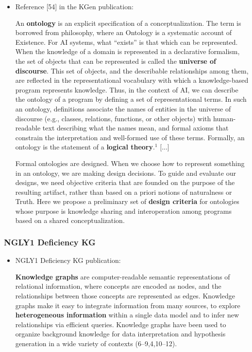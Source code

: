 \documentclass{article}
\begin{document}
\begin{itemize}
\item Reference [54] in the KGen publication:
\begin{displayquote}
An \textbf{ontology} is an explicit specification of a conceptualization. The term is borrowed from philosophy, where an Ontology is a systematic account of Existence. For AI systems, what “exists” is that which can be represented. When the knowledge of a domain is represented in a declarative formalism, the set of objects that can be represented is called the \textbf{universe of discourse}. This set of objects, and the describable relationships among them, are reflected in the representational vocabulary with which a knowledge-based program represents knowledge. Thus, in the context of AI, we can describe the ontology of a program by defining a set of representational terms. In such an ontology, definitions associate the names of entities in the universe of discourse (e.g., classes, relations, functions, or other objects) with human-readable text describing what the names mean, and formal axioms that constrain the interpretation and well-formed use of these terms. Formally, an ontology is the statement of a \textbf{logical theory}.$^1$ [...]

Formal ontologies are designed. When we choose how to represent something in an ontology, we are making design decisions. To guide and evaluate our designs, we need objective criteria that are founded on the purpose of the resulting artifact, rather than based on a priori notions of naturalness or Truth. Here we propose a preliminary set of \textbf{design criteria} for ontologies whose purpose is knowledge sharing and interoperation among programs based on a shared conceptualization.
\end{displayquote}

\end{itemize}


\subsubsection{NGLY1 Deficiency KG}

\begin{itemize}

\item NGLY1 Deficiency KG publication:
\begin{displayquote}
\textbf{Knowledge graphs} are computer-readable semantic representations of relational information, where concepts are encoded as nodes, and the relationships between those concepts are represented as edges. Knowledge graphs make it easy to integrate information from many sources, to explore \textbf{heterogeneous information} within a single data model and to infer new relationships via efficient queries. Knowledge graphs have been used to organize background knowledge for data interpretation and hypothesis generation in a wide variety of contexts (6–9,4,10–12).
\end{displayquote}

\end{itemize}
\end{document}
